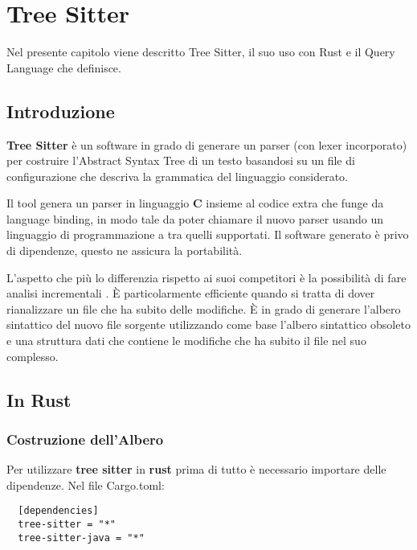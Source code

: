 \chapter{Tree Sitter}

Nel presente capitolo viene descritto Tree Sitter, il suo uso con Rust e il Query Language che definisce.

\section{Introduzione}

\textbf{Tree Sitter} \cite{TreeSitter} \`e un software in grado di generare un parser (con lexer incorporato) per costruire l'Abstract Syntax Tree di un testo basandosi su un file di configurazione che descriva la grammatica del linguaggio considerato.

Il tool \cite{TreeSitterCreatingParsers} genera un parser in linguaggio \textbf{C} insieme al codice extra che funge da language binding, in modo tale da poter chiamare il nuovo parser usando un linguaggio di programmazione a tra quelli supportati.
Il software generato \`e privo di dipendenze, questo ne assicura la portabilit\`a.

L'aspetto che pi\`u lo differenzia rispetto ai suoi competitori \`e la possibilit\`a di fare analisi incrementali \cite{TreeSitterAdvancedParsing}.
\`E particolarmente efficiente quando si tratta di dover rianalizzare un file che ha subito delle modifiche.
\`E in grado di generare l'albero sintattico del nuovo file sorgente utilizzando come base l'albero sintattico obsoleto e una struttura dati che contiene le modifiche che ha subito il file nel suo complesso.

\section{In Rust}

\subsection{Costruzione dell'Albero}

Per utilizzare \textbf{tree sitter} in \textbf{rust} \cite{TreeSitterCrate} prima di tutto \`e necessario importare delle dipendenze. Nel file Cargo.toml:

\begin{lstlisting}
  [dependencies]
  tree-sitter = "*"
  tree-sitter-java = "*"
\end{lstlisting}

